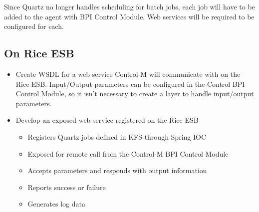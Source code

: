 \documentclass[12pt,notitlepage]{article}
\begin{document}
Since Quartz no longer handles scheduling for batch jobs, each job will have to be added to the agent with BPI Control Module. Web services
will be required to be configured for each.

\subsection{On Rice ESB}
\begin{itemize}
  \item Create WSDL for a web service Control-M will communicate with on the Rice ESB. Input/Output
    parameters can be configured in the Control BPI Control Module, so it isn't necessary to create a layer to handle input/output
    parameters.
  \item Develop an exposed web service registered on the Rice ESB
    \begin{itemize}
      \item Registers Quartz jobs defined in KFS through Spring IOC
      \item Exposed for remote call from the Control-M BPI Control Module
      \item Accepts parameters and responds with output information
      \item Reports success or failure
      \item Generates log data
    \end{itemize}
\end{itemize}
\end{document}
